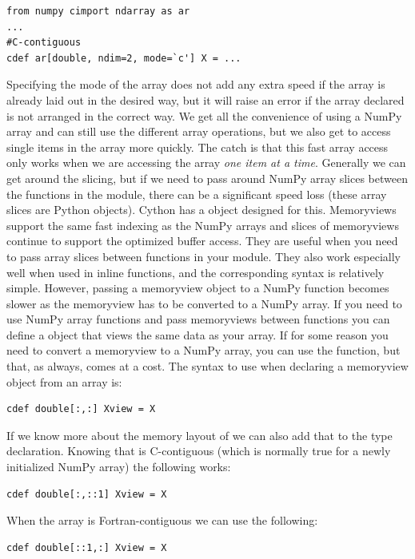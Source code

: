 \begin{lstlisting}
from numpy cimport ndarray as ar
...
#C-contiguous
cdef ar[double, ndim=2, mode=`c'] X = ...
\end{lstlisting}
Specifying the mode of the array does not add any extra speed if the array is already laid out in the desired way, but it will raise an error if the array declared is not arranged in the correct way.
We get all the convenience of using a NumPy array and can still use the different array operations, but we also get to access single items in the array more quickly.
The catch is that this fast array access only works when we are accessing the array \textit{one item at a time}.
Generally we can get around the slicing, but if we need to pass around NumPy array slices between the functions in the module, there can be a significant speed loss (these array slices are Python objects).
Cython has a  object designed for this.
Memoryviews support the same fast indexing as the NumPy arrays and slices of memoryviews continue to support the optimized buffer access.
They are useful when you need to pass array slices between functions in your module.
They also work especially well when used in inline functions, and the corresponding syntax is relatively simple.
However, passing a memoryview object to a NumPy function becomes slower as the memoryview has to be converted to a NumPy array.
If you need to use NumPy array functions and pass memoryviews between functions you can define a  object that views the same data as your array.
If for some reason you need to convert a memoryview to a NumPy array, you can use the  function, but that, as always, comes at a cost.
The syntax to use when declaring a memoryview object from an array  is:
\begin{lstlisting}
cdef double[:,:] Xview = X
\end{lstlisting}
If we know more about the memory layout of  we can also add that to the type declaration.
Knowing that  is C-contiguous (which is normally true for a newly initialized NumPy array) the following works:
\begin{lstlisting}
cdef double[:,::1] Xview = X
\end{lstlisting}
When the array is Fortran-contiguous we can use the following:
\begin{lstlisting}
cdef double[::1,:] Xview = X
\end{lstlisting}

